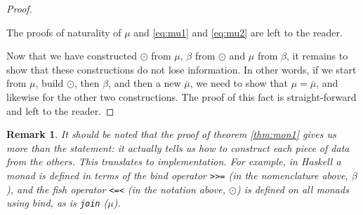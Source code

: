\documentclass[11pt]{article}
\newtheorem{remark}{Remark}
\theoremstyle{nonumberplain}
\newtheorem{proof}{Proof}
\newcommand*\lsin{\lstinline}
\begin{document}
\begin{proof}
\begin{itemize}
The proofs of naturality of $\mu$ and \eqref{eq:mu1} and \eqref{eq:mu2} are left to the reader.
\end{itemize}

Now that we have constructed $\odot$ from $\mu$, $\beta$ from $\odot$ and $\mu$ from $\beta$, it remains to show that these constructions do not lose information. In other words, if we start from $\mu$, build $\odot$, then $\beta$, and then a new $\overline{\mu}$, we need to show that $\mu = \overline{\mu}$, and likewise for the other two constructions. The proof of this fact is straight-forward and left to the reader.
\end{proof}

\begin{remark}
It should be noted that the proof of theorem \ref{thm:mon1} gives us more than the statement: it actually tells us how to construct each piece of data from the others. This translates to implementation. For example, in Haskell a monad is defined in terms of the bind operator \lsin|>>=| (in the nomenclature above, $\beta$), and the fish operator \lsin|<=<| (in the notation above, $\odot$) is defined on all monads using bind, as is \lsin|join| ($\mu$).
\end{remark}
\end{document}
